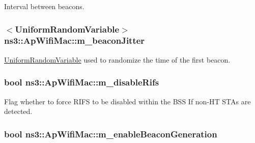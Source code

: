 Interval between beacons. 

\subsubsection[{\texorpdfstring{m\+\_\+beacon\+Jitter}{m_beaconJitter}}]{$<${\bf Uniform\+Random\+Variable}$>$ ns3\+::\+Ap\+Wifi\+Mac\+::m\+\_\+beacon\+Jitter\hspace{0.3cm}{\ttfamily [private]}}\hypertarget{classns3_1_1ApWifiMac_a319661e15bf89aedd0e0a3494195d055}{}\label{classns3_1_1ApWifiMac_a319661e15bf89aedd0e0a3494195d055}


\hyperlink{classns3_1_1UniformRandomVariable}{Uniform\+Random\+Variable} used to randomize the time of the first beacon. 

\subsubsection[{\texorpdfstring{m\+\_\+disable\+Rifs}{m_disableRifs}}]{\setlength{\rightskip}{0pt plus 5cm}bool ns3\+::\+Ap\+Wifi\+Mac\+::m\+\_\+disable\+Rifs\hspace{0.3cm}{\ttfamily [private]}}\hypertarget{classns3_1_1ApWifiMac_ab5ac2f56d033984a8db29d69aa230811}{}\label{classns3_1_1ApWifiMac_ab5ac2f56d033984a8db29d69aa230811}


Flag whether to force R\+I\+FS to be disabled within the B\+SS If non-\/\+HT S\+T\+As are detected. 

\subsubsection[{\texorpdfstring{m\+\_\+enable\+Beacon\+Generation}{m_enableBeaconGeneration}}]{\setlength{\rightskip}{0pt plus 5cm}bool ns3\+::\+Ap\+Wifi\+Mac\+::m\+\_\+enable\+Beacon\+Generation\hspace{0.3cm}{\ttfamily [private]}}\hypertarget{classns3_1_1ApWifiMac_a783d01de4969a1227232246d82ce1ce9}{}\label{classns3_1_1ApWifiMac_a783d01de4969a1227232246d82ce1ce9}


